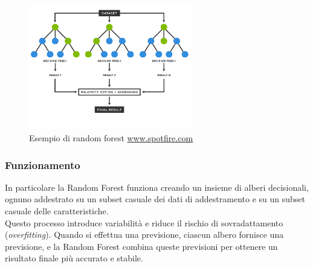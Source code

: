 \documentclass[italian,12pt,a4paper]{article}
\begin{document}
	\begin{figure}[!h]
		\centering
		\includegraphics[width=270px]{img/random-forest-diagram}
		\caption{Esempio di random forest \href{https://www.spotfire.com/glossary/what-is-a-random-forest}{www.spotfire.com}}
	\end{figure}

	\subsubsection{Funzionamento}
	In particolare la Random Forest funziona creando un insieme di alberi decisionali, ognuno addestrato su un subset casuale dei dati di addestramento e su un subset casuale delle caratteristiche.\\
	Questo processo introduce variabilità e riduce il rischio di sovradattamento (\textit{overfitting}). Quando si effettua una previsione, ciascun albero fornisce una previsione, e la Random Forest combina queste previsioni per ottenere un risultato finale più accurato e stabile.
\end{document}
